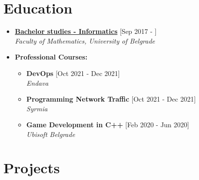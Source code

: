 \documentclass[a4paper]{moderncv}
\begin{document}
\makecvtitle
\vspace{-2em}



\section{Education}

\begin{itemize}

	\item \textbf{\href{http://www.matf.bg.ac.rs/eng/m/94/osnovne-informatics/}{Bachelor studies - Informatics}} \hfill [Sep 2017 - ]\\
	\textit{Faculty of Mathematics, University of Belgrade}				
	
	\item \textbf{Professional Courses:}
	\vspace{-0.5em}
	\begin{itemize}
		\setlength\itemsep{0.5pt}
		\item \textbf{DevOps} \hfill[Oct 2021 - Dec 2021]\\
		\small\textit{Endava}\normalsize

		\item \textbf{Programming Network Traffic} \hfill[Oct 2021 - Dec 2021]\\
		\small\textit{Syrmia}\normalsize

		\item \textbf{Game Development in C++} \hfill[Feb 2020 - Jun 2020]\\
		\small\textit{Ubisoft Belgrade}\normalsize
	\end{itemize}
	
\end{itemize}


\section{Projects}	
\end{document}
